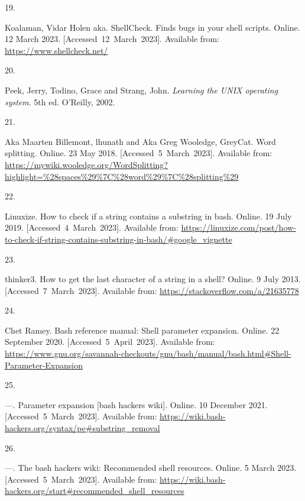 \documentclass[
  a4paper,
]{article}
\newlength{\cslhangindent}
\newlength{\csllabelwidth}
\newlength{\cslentryspacingunit} %
\newenvironment{CSLReferences}[2] %
 {%
  \setlength{\parindent}{0pt}
  \ifodd #1
  \let\oldpar\par
  \def\par{\hangindent=\cslhangindent\oldpar}
  \fi
  \setlength{\parskip}{#2\cslentryspacingunit}
 }%
 {}
\newcommand{\CSLLeftMargin}[1]{\parbox[t]{\csllabelwidth}{#1}}
\newcommand{\CSLRightInline}[1]{\parbox[t]{\linewidth - \csllabelwidth}{#1}\break}
\begin{document}
\begin{CSLReferences}{0}{0}
\leavevmode{}%
\CSLLeftMargin{19. }%
\CSLRightInline{Koalaman, Vidar Holen aka. ShellCheck. Finds bugs in
your shell scripts. Online. 12 March 2023. {[}Accessed~12~March~2023{]}.
Available from: \url{https://www.shellcheck.net/}}

\leavevmode{}%
\CSLLeftMargin{20. }%
\CSLRightInline{Peek, Jerry, Todino, Grace and Strang, John.
\emph{Learning the UNIX operating system}. 5th ed. O'Reilly, 2002. }

\leavevmode{}%
\CSLLeftMargin{21. }%
\CSLRightInline{Aka Maarten Billemont, lhunath and Aka Greg Wooledge,
GreyCat. Word splitting. Online. 23 May 2018.
{[}Accessed~5~March~2023{]}. Available from:
\url{https://mywiki.wooledge.org/WordSplitting?highlight=\%28spaces\%29\%7C\%28word\%29\%7C\%28splitting\%29}}

\leavevmode{}%
\CSLLeftMargin{22. }%
\CSLRightInline{Linuxize. How to check if a string contains a substring
in bash. Online. 19 July 2019. {[}Accessed~4~March~2023{]}. Available
from:
\url{https://linuxize.com/post/how-to-check-if-string-contains-substring-in-bash/\#google_vignette}}

\leavevmode{}%
\CSLLeftMargin{23. }%
\CSLRightInline{thinker3. How to get the last character of a string in a
shell? Online. 9 July 2013. {[}Accessed~7~March~2023{]}. Available from:
\url{https://stackoverflow.com/a/21635778}}

\leavevmode{}%
\CSLLeftMargin{24. }%
\CSLRightInline{Chet Ramey. Bash reference manual: Shell parameter
expansion. Online. 22 September 2020. {[}Accessed~5~April~2023{]}.
Available from:
\url{https://www.gnu.org/savannah-checkouts/gnu/bash/manual/bash.html\#Shell-Parameter-Expansion}}

\leavevmode{}%
\CSLLeftMargin{25. }%
\CSLRightInline{---. Parameter expansion {[}bash hackers wiki{]}.
Online. 10 December 2021. {[}Accessed~5~March~2023{]}. Available from:
\url{https://wiki.bash-hackers.org/syntax/pe\#substring_removal}}

\leavevmode{}%
\CSLLeftMargin{26. }%
\CSLRightInline{---. The bash hackers wiki: Recommended shell resources.
Online. 5 March 2023. {[}Accessed~5~March~2023{]}. Available from:
\url{https://wiki.bash-hackers.org/start\#recommended_shell_resources}}

\end{CSLReferences}
\end{document}
